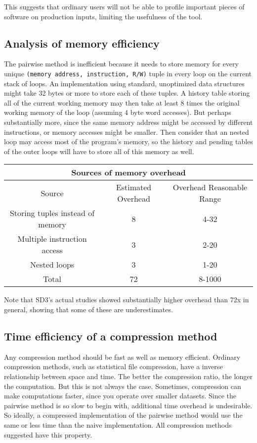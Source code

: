 \documentclass[12pt,twoside]{reedthesis}
\begin{document}
		This suggests that ordinary users will not be able to profile important pieces of software on production inputs, limiting the usefulness of the tool.
		
		\subsection{Analysis of memory efficiency}
		
		The pairwise method is inefficient because it needs to store memory for every unique \texttt{(memory address, instruction, R/W)} tuple in every loop on the current stack of loops. An implementation using standard, unoptimized data structures might take 32 bytes or more to store each of these tuples. A history table storing all of the current working memory may then take at least 8 times the original working memory of the loop (assuming 4 byte word accesses). But perhaps substantially more, since the same memory address might be accessed by different instructions, or memory accesses might be smaller. Then consider that an nested loop may access most of the program's memory, so the history and pending tables of the outer loops will have to store all of this memory as well. 
		
		
		\begin{tabular}{ |c|c|c| } 
			\hline
			\multicolumn{3}{|c|}{Sources of memory overhead} \\
			\hline
			Source & Estimated Overhead & Overhead Reasonable Range \\ 
			\hline 
			Storing tuples instead of memory & 8 & 4-32 \\ 	\hline
			Multiple instruction access & 3 & 2-20 \\ \hline
			Nested loops & 3 & 1-20 \\ \hline
			\hline
			Total & 72 & 8-1000 \\ \hline
		\end{tabular}
	
		Note that SD3's actual studies showed substantially higher overhead than 72x in general, showing that some of these are underestimates. 
		
		\subsection{Time efficiency of a compression method}
		
		Any compression method should be fast as well as memory efficient. 
		Ordinary compression methods, such as statistical file compression, have a inverse relationship between space and time. The better the compression ratio, the longer the computation. But this is not always the case. Sometimes, compression can make computations faster, since you operate over smaller datasets. Since the pairwise method is so slow to begin with, additional time overhead is undesirable. So ideally, a compressed implementation of the pairwise method would use the same or less time than the naive implementation. All compression methods suggested have this property. 
		
\end{document}
